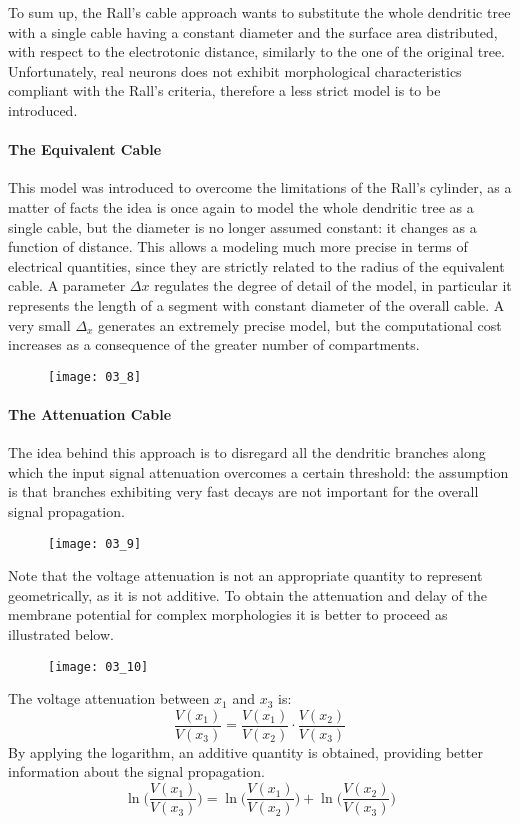 To sum up, the Rall's cable approach wants to substitute the whole dendritic tree with a single
cable having a constant diameter and the surface area distributed, with respect to the electrotonic
distance, similarly to the one of the original tree. Unfortunately, real neurons does not exhibit
morphological characteristics compliant with the Rall's criteria, therefore a less strict model
is to be introduced.
\paragraph{The Equivalent Cable}
This model was introduced to overcome the limitations of the Rall's cylinder, as a matter of
facts the idea is once again to model the whole dendritic tree as a single cable, but
the diameter is no longer assumed constant: it changes as a function of distance. This allows
a modeling much more precise in terms of electrical quantities, since they are strictly
related to the radius of the equivalent cable. A parameter \(\Delta{x}\) regulates the degree
of detail of the model, in particular it represents the length of a segment with constant
diameter of the overall cable. A very small \(\Delta_{x}\) generates an extremely precise model,
but the computational cost increases as a consequence of the greater number of compartments.
\begin{figure}[H]
    \texttt{[image: 03\_8]}
    \centering
\end{figure}
\paragraph{The Attenuation Cable}
The idea behind this approach is to disregard all the dendritic branches along which the
input signal attenuation overcomes a certain threshold: the assumption is that branches
exhibiting very fast decays are not important for the overall signal propagation.
\begin{figure}[H]
    \texttt{[image: 03\_9]}
    \centering
\end{figure}
Note that the voltage attenuation is not an appropriate quantity to represent geometrically,
as it is not additive. To obtain the attenuation and delay of the membrane potential
for complex morphologies it is better to proceed as illustrated below.
\begin{figure}[H]
    \texttt{[image: 03\_10]}
    \centering
\end{figure}
The voltage attenuation between \(x_{1}\) and \(x_{3}\) is:
\begin{equation*}
    \frac{V(x_{1})}{V(x_{3})}=\frac{V(x_{1})}{V(x_{2})}\cdot{\frac{V(x_{2})}{V(x_{3})}}
\end{equation*}
By applying the logarithm, an additive quantity is obtained, providing better information
about the signal propagation.
\begin{equation*}
    \ln{\biggl(\frac{V(x_{1})}{V(x_{3})}\biggr)}=
    \ln{\biggl(\frac{V(x_{1})}{V(x_{2})}\biggr)}+\ln{\biggl(\frac{V(x_{2})}{V(x_{3})}\biggr)}
\end{equation*}

